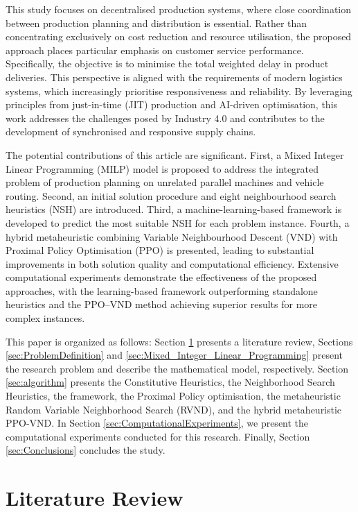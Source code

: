 \documentclass{article}
\begin{document}
This study focuses on decentralised production systems, where close coordination between production planning and distribution is essential. Rather than concentrating exclusively on cost reduction and resource utilisation, the proposed approach places particular emphasis on customer service performance. Specifically, the objective is to minimise the total weighted delay in product deliveries. This perspective is aligned with the requirements of modern logistics systems, which increasingly prioritise responsiveness and reliability. By leveraging principles from just-in-time (JIT) production and AI-driven optimisation, this work addresses the challenges posed by Industry 4.0 and contributes to the development of synchronised and responsive supply chains.

The potential contributions of this article are significant. First, a Mixed Integer Linear Programming (MILP) model is proposed to address the integrated problem of production planning on unrelated parallel machines and vehicle routing. Second, an initial solution procedure and eight neighbourhood search heuristics (NSH) are introduced. Third, a machine-learning-based framework is developed to predict the most suitable NSH for each problem instance. Fourth, a hybrid metaheuristic combining Variable Neighbourhood Descent (VND) with Proximal Policy Optimisation (PPO) is presented, leading to substantial improvements in both solution quality and computational efficiency. Extensive computational experiments demonstrate the effectiveness of the proposed approaches, with the learning-based framework outperforming standalone heuristics and the PPO–VND method achieving superior results for more complex instances.

This paper is organized as follows: Section \ref{sec:LiteratureReview} presents a literature review, Sections \ref{sec:ProblemDefinition} and \ref{sec:Mixed_Integer_Linear_Programming} present the research problem and describe the mathematical model, respectively. Section \ref{sec:algorithm}  presents the Constitutive Heuristics, the Neighborhood Search Heuristics, the framework, the Proximal Policy optimisation, the metaheuristic Random Variable Neighborhood Search (RVND), and the hybrid metaheuristic PPO-VND. In Section \ref{sec:ComputationalExperiments}, we present the computational experiments conducted for this research. Finally, Section \ref{sec:Conclusions} concludes the study.

\section{Literature Review}
\label{sec:LiteratureReview}
\end{document}
